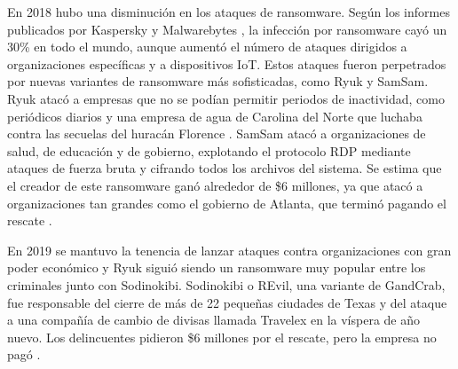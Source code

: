 
En 2018 hubo una disminución en los ataques de ransomware. Según los informes publicados por Kaspersky \cite{63} y Malwarebytes \cite{64}, la infección por ransomware cayó un 30\% en todo el mundo, aunque aumentó el número de ataques dirigidos a organizaciones específicas y a dispositivos \gls{IoT}. Estos ataques fueron perpetrados por nuevas variantes de ransomware más sofisticadas, como Ryuk y SamSam. Ryuk atacó a empresas que no se podían permitir periodos de inactividad, como periódicos diarios \cite{66} y una empresa de agua de Carolina del Norte que luchaba contra las secuelas del huracán Florence \cite{67}. %
SamSam atacó a organizaciones de salud, de educación y de gobierno, explotando el protocolo \gls{RDP} mediante ataques de fuerza bruta y cifrando todos los archivos del sistema. Se estima que el creador de este ransomware ganó alrededor de \$6 millones, ya que atacó a organizaciones tan grandes como el gobierno de Atlanta, que terminó pagando el rescate \cite{9}.

En 2019 se mantuvo la tenencia de lanzar ataques contra organizaciones con gran poder económico y Ryuk siguió siendo un ransomware muy popular entre los criminales junto con Sodinokibi. Sodinokibi o REvil, una variante de GandCrab, fue responsable del cierre de más de 22 pequeñas ciudades de Texas \cite{68} y del ataque a una compañía de cambio de divisas llamada Travelex en la víspera de año nuevo. %
Los delincuentes pidieron \$6 millones por el rescate, pero la empresa no pagó \cite{69}.

